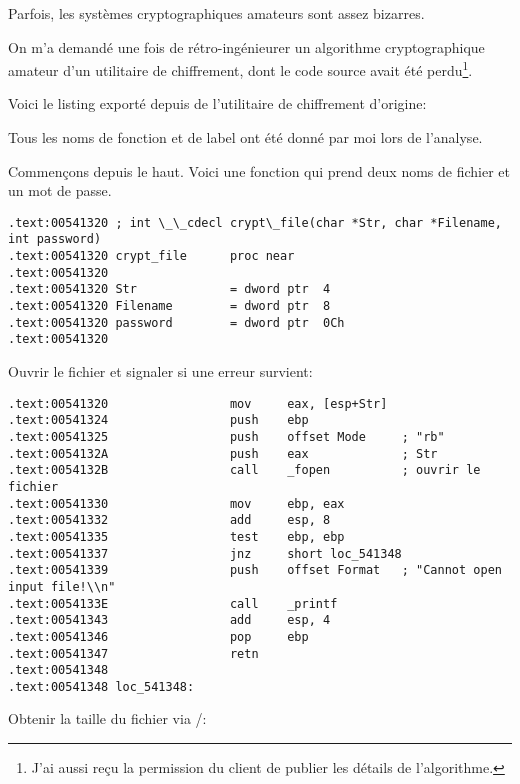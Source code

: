 ﻿

Parfois, les systèmes cryptographiques amateurs sont assez bizarres.

On m'a demandé une fois de rétro-ingénieurer un algorithme cryptographique amateur
d'un utilitaire de chiffrement, dont le code source avait été perdu\footnote{J'ai
aussi reçu la permission du client de publier les détails de l'algorithme.}.

Voici le listing exporté depuis \IDA de l'utilitaire de chiffrement d'origine:


Tous les noms de fonction et de label ont été donné par moi lors de l'analyse.

Commençons depuis le haut. Voici une fonction qui prend deux noms de fichier et un
mot de passe.

\begin{lstlisting}[style=customasmx86]
.text:00541320 ; int \_\_cdecl crypt\_file(char *Str, char *Filename, int password)
.text:00541320 crypt_file      proc near
.text:00541320
.text:00541320 Str             = dword ptr  4
.text:00541320 Filename        = dword ptr  8
.text:00541320 password        = dword ptr  0Ch
.text:00541320
\end{lstlisting}

Ouvrir le fichier et signaler si une erreur survient:

\begin{lstlisting}[style=customasmx86]
.text:00541320                 mov     eax, [esp+Str]
.text:00541324                 push    ebp
.text:00541325                 push    offset Mode     ; "rb"
.text:0054132A                 push    eax             ; Str
.text:0054132B                 call    _fopen          ; ouvrir le fichier
.text:00541330                 mov     ebp, eax
.text:00541332                 add     esp, 8
.text:00541335                 test    ebp, ebp
.text:00541337                 jnz     short loc_541348
.text:00541339                 push    offset Format   ; "Cannot open input file!\\n"
.text:0054133E                 call    _printf
.text:00541343                 add     esp, 4
.text:00541346                 pop     ebp
.text:00541347                 retn
.text:00541348
.text:00541348 loc_541348:
\end{lstlisting}

Obtenir la taille du fichier via /:

